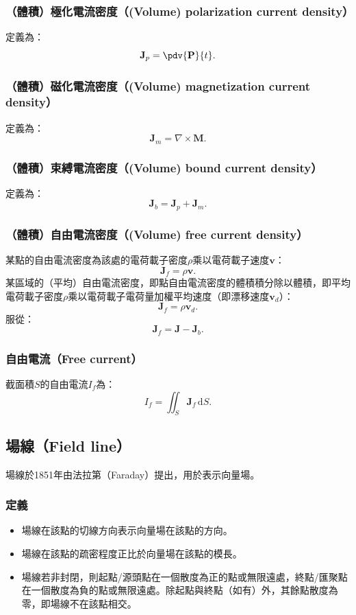 \documentclass[a4paper,12pt]{report}
\begin{document}
\begin{itemize}
\subsubsection{（體積）極化電流密度（(Volume) polarization current density）}
定義為：
\[\mathbf{J}_p=\pdv{\mathbf{P}}{t}.\]
\subsubsection{（體積）磁化電流密度（(Volume) magnetization current density）}
定義為：
\[\mathbf{J}_m=\nabla \times \mathbf{M}.\]
\subsubsection{（體積）束縛電流密度（(Volume) bound current density）}
定義為：
\[\mathbf{J}_b = \mathbf{J}_p + \mathbf{J}_m.\]
\subsubsection{（體積）自由電流密度（(Volume) free current density）}
某點的自由電流密度為該處的電荷載子密度$\rho$乘以電荷載子速度$\mathbf{v}$：
\[\mathbf{J}_f=\rho\mathbf{v}.\]
某區域的（平均）自由電流密度，即點自由電流密度的體積積分除以體積，即平均電荷載子密度$\rho$乘以電荷載子電荷量加權平均速度（即漂移速度$\mathbf{v}_d$）：
\[\mathbf{J}_f=\rho\mathbf{v}_d.\]
服從：
\[\mathbf{J}_f=\mathbf{J}-\mathbf{J}_b.\]
\subsubsection{自由電流（Free current）}
截面積$S$的自由電流$I_f$為：
\[I_f=\iint_S\mathbf{J}_f\,\mathrm{d}S.\]
\subsection{場線（Field line）}
場線於1851年由法拉第（Faraday）提出，用於表示向量場。
\subsubsection{定義}
\begin{itemize}
\item 場線在該點的切線方向表示向量場在該點的方向。
\item 場線在該點的疏密程度正比於向量場在該點的模長。
\item 場線若非封閉，則起點/源頭點在一個散度為正的點或無限遠處，終點/匯聚點在一個散度為負的點或無限遠處。除起點與終點（如有）外，其餘點散度為零，即場線不在該點相交。
\end{itemize}

\end{itemize}
\end{document}
